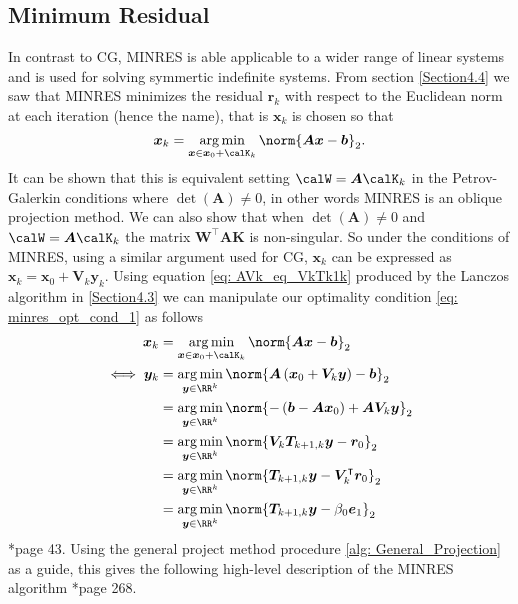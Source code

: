 \subsection{Minimum Residual}\label{Section4.6}
In contrast to CG, MINRES is able applicable to a wider range of linear systems and is used for solving symmertic indefinite systems. From section \ref{Section4.4} we saw that MINRES minimizes the residual $\bm{r}_k$ with respect to the Euclidean norm at each iteration (hence the name), that is $\bm{x}_k$ is chosen so that
\begin{equation} \label{eq: minres_opt_cond_1}
    \bm{x}_k = \argmin_{\bm{x} \in \bm{x}_0 + \calK_k} \norm{\bm{A} \bm {x} - \bm{b}}_2.
\end{equation}
It can be shown that this is equivalent setting $\calW = \bm{A} \calK_k$ in the Petrov-Galerkin conditions where $\det \left( \bm{A} \right) \neq 0$, in other words MINRES is an oblique projection method. We can also show that when $\det \left( \bm{A} \right) \neq 0$ and $\calW = \bm{A} \calK_k$ the matrix $\bm{W}^{\intercal} \bm{A} \bm{K}$ is non-singular. So under the conditions of MINRES, using a similar argument used for CG, $\bm{x}_k$ can be expressed as $\bm{x}_k = \bm{x}_0 + \bm{V}_k \bm{y}_k$. Using equation \ref{eq: AVk_eq_VkTk1k} produced by the Lanczos algorithm in \ref{Section4.3} we can manipulate our optimality condition \ref{eq: minres_opt_cond_1} as follows
\begin{align*}
    \bm{x}_k      & = \argmin_{\bm{x} \in \bm{x}_0 + \calK_k} \norm{\bm{A} \bm {x} - \bm{b}}_2                                 \\
    \iff \bm{y}_k & = \argmin_{\bm{y} \in \RR^k} \norm{\bm{A} \left( \bm{x}_0 + \bm{V}_k \bm{y} \right) - \bm{b}}_2            \\
                  & = \argmin_{\bm{y} \in \RR^k} \norm{ - \left( \bm{b} - \bm{A} \bm{x}_0 \right) + \bm{A} \bm{V}_k \bm{y} }_2 \\
                  & = \argmin_{\bm{y} \in \RR^k} \norm{ \bm{V}_{k} \bm{T}_{k+1,k} \bm{y} - \bm{r}_0 }_2                        \\
                  & = \argmin_{\bm{y} \in \RR^k} \norm{ \bm{T}_{k+1,k} \bm{y} - \bm{V}_{k}^{\intercal} \bm{r}_0 }_2            \\
                  & = \argmin_{\bm{y} \in \RR^k} \norm{ \bm{T}_{k+1,k} \bm{y} - \beta_0 \bm{e}_1 }_2
\end{align*}
\cite{GreenbaumAnne1997Imfs}*{page 43}. Using the general project method procedure \ref{alg: General_Projection} as a guide, this gives the following high-level description of the MINRES algorithm \cite{TrefethenLloydN.LloydNicholas1997Nla/}*{page 268}.
